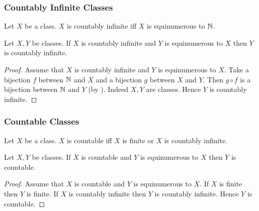 \documentclass[10pt]{article}
\begin{document}
  \subsubsection*{Countably Infinite Classes}

  \begin{forthel}
    \begin{definition}
      Let $X$ be a class.
      $X$ is countably infinite iff $X$ is equinumerous to $\mathbb{N}$.
    \end{definition}
  \end{forthel}

  \begin{forthel}
    \begin{proposition}
      Let $X, Y$ be classes.
      If $X$ is countably infinite and $Y$ is equinumerous to $X$ then $Y$ is countably infinite.
    \end{proposition}
    \begin{proof}
      Assume that $X$ is countably infinite and $Y$ is equinumerous to $X$.
      Take a bijection $f$ between $\mathbb{N}$ and $X$ and a bijection $g$ between $X$ and $Y$.
      Then $g \circ f$ is a bijection between $\mathbb{N}$ and $Y$ (by ).
      Indeed $X, Y$ are classes.
      Hence $Y$ is countably infinite.
    \end{proof}
  \end{forthel}


  \subsubsection*{Countable Classes}

  \begin{forthel}
    \begin{definition}
      Let $X$ be a class.
      $X$ is countable iff $X$ is finite or $X$ is countably infinite.
    \end{definition}
  \end{forthel}

  \begin{forthel}
    \begin{proposition}
      Let $X, Y$ be classes.
      If $X$ is countable and $Y$ is equinumerous to $X$ then $Y$ is countable.
    \end{proposition}
    \begin{proof}
      Assume that $X$ is countable and $Y$ is equinumerous to $X$.
      If $X$ is finite then $Y$ is finite.
      If $X$ is countably infinite then $Y$ is countably infinite.
      Hence $Y$ is countable.
    \end{proof}
  \end{forthel}
\end{document}
